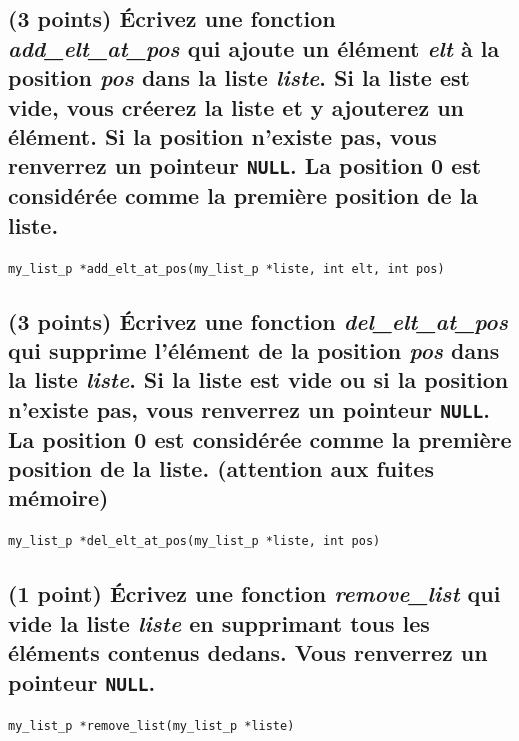\documentclass[11pt,a4paper]{article}
\begin{document}
\vfillLast

\newpage

\subsection{(3 points) \'Ecrivez une fonction \og \textit{add\_elt\_at\_pos} \fg{} qui ajoute un élément \textit{elt} à la position \textit{pos} dans la liste \textit{liste}. Si la liste est vide, vous créerez la liste et y ajouterez un élément. Si la position n'existe pas, vous renverrez un pointeur \texttt{NULL}. La position 0 est considérée comme la première position de la liste. }

\bigskip

\texttt{my\_list\_p *add\_elt\_at\_pos(my\_list\_p *liste, int elt, int pos)}

\begin{center}
\end{center}

\newpage

\subsection{(3 points) \'Ecrivez une fonction \og \textit{del\_elt\_at\_pos} \fg{} qui supprime l'élément de la position \textit{pos} dans la liste \textit{liste}. Si la liste est vide ou si la position n'existe pas, vous renverrez un pointeur \texttt{NULL}. La position 0 est considérée comme la première position de la liste. (attention aux fuites mémoire) }

\bigskip

\texttt{my\_list\_p *del\_elt\_at\_pos(my\_list\_p *liste, int pos)}

\begin{center}
\end{center}

\newpage

\subsection{(1 point) \'Ecrivez une fonction \og \textit{remove\_list} \fg{} qui vide la liste \textit{liste} en supprimant tous les éléments contenus dedans. Vous renverrez un pointeur \texttt{NULL}. }

\bigskip

\texttt{my\_list\_p *remove\_list(my\_list\_p *liste)}

\begin{center}
\end{center}
\end{document}
